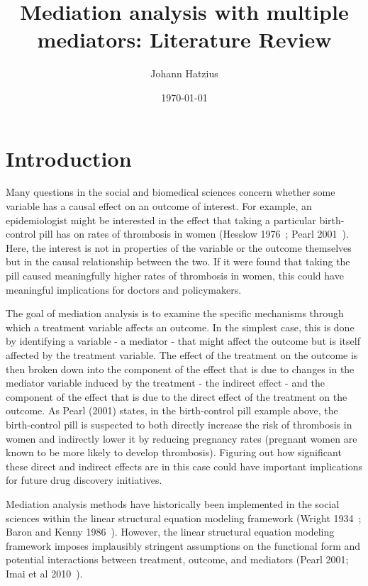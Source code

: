 \documentclass[11pt]{article} %
\title{Mediation analysis with multiple mediators: Literature Review}
\author{Johann Hatzius}
\date{\today}
\numberwithin{equation}{section} %
\begin{document}
\maketitle

\section{Introduction}

Many questions in the social and biomedical sciences concern whether some variable has a causal effect on an outcome of interest. For example, an epidemiologist might be interested in the effect that taking a particular birth-control pill has on rates of thrombosis in women (Hesslow 1976~\citep{hesslow1976}; Pearl 2001~\citep{pearl2001}). Here, the interest is not in properties of the variable or the outcome themselves but in the causal relationship between the two. If it were found that taking the pill caused meaningfully higher rates of thrombosis in women, this could have meaningful implications for doctors and policymakers. 

The goal of mediation analysis is to examine the specific mechanisms through which a treatment variable affects an outcome. In the simplest case, this is done by identifying a variable - a mediator - that might affect the outcome but is itself affected by the treatment variable. The effect of the treatment on the outcome is then broken down into the component of the effect that is due to changes in the mediator variable induced by the treatment - the indirect effect - and the component of the effect that is due to the direct effect of the treatment on the outcome. As Pearl (2001) states, in the birth-control pill example above, the birth-control pill is suspected to both directly increase the risk of thrombosis in women and indirectly lower it by reducing pregnancy rates (pregnant women are known to be more likely to develop thrombosis). Figuring out how significant these direct and indirect effects are in this case could have important implications for future drug discovery initiatives. 

Mediation analysis methods have historically been implemented in the social sciences within the linear structural equation modeling framework (Wright 1934~\citep{wright1934}; Baron and Kenny 1986~\citep{baronkenny1986}). However, the linear structural equation modeling framework imposes implausibly stringent assumptions on the functional form and potential interactions between treatment, outcome, and mediators (Pearl 2001; Imai et al 2010~\citep{imaietal2010}). 
\end{document}
